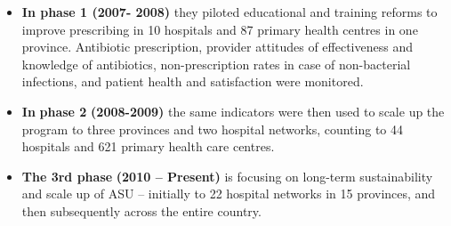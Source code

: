 \documentclass[
]{book}
\begin{document}
\begin{itemize}
\item
  \textbf{In phase 1 (2007- 2008)} they piloted educational and training reforms to improve prescribing in 10 hospitals and 87 primary health centres in one province. Antibiotic prescription, provider attitudes of effectiveness and knowledge of antibiotics, non-prescription rates in case of non-bacterial infections, and patient health and satisfaction were monitored.
\item
  \textbf{In} \textbf{phase 2} \textbf{(2008-2009)} the same indicators were then used to scale up the program to three provinces and two hospital networks, counting to 44 hospitals and 621 primary health care centres.
\item
  \textbf{The 3rd phase} \textbf{(2010 -- Present)} is focusing on long-term sustainability and scale up of ASU -- initially to 22 hospital networks in 15 provinces, and then subsequently across the entire country.
\end{itemize}
\end{document}
